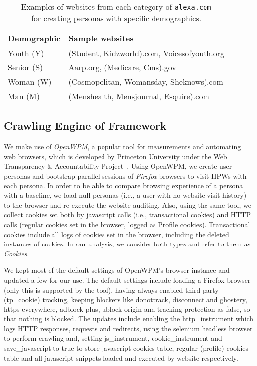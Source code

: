 \documentclass{article}
\newcommand{\hpws}{HPWs\xspace}
\newcommand{\alexa}{\texttt{alexa.com}}
\begin{document}
\begin{table}
    \centering
    \caption{Examples of websites from each category of \alexa\\for creating personas with specific demographics.}
    {\small 
        \begin{tabular}{p{1.8cm}p{5.7cm}} 
            \toprule
            Demographic	&	Sample websites	\\
            \midrule
            Youth (Y)		&	(Student, Kidzworld).com, Voicesofyouth.org \\
            Senior (S)		&	Aarp.org, (Medicare, Cms).gov \\
            \midrule
            Woman (W)	&	(Cosmopolitan, Womansday, Sheknows).com \\
            Man (M)		&	(Menshealth, Mensjournal, Esquire).com \\
            \bottomrule
        \end{tabular}
    }
    \label{table:Alexa}
\end{table}



\subsection{Crawling Engine of Framework}\label{sec:crawling}

We make use of \emph{OpenWPM}\cite{openwpm-code}, a popular tool for measurements and automating web browsers, which is developed by Princeton University under the Web Transparency \& Accountability Project~\cite{englehardt2016online}.
Using OpenWPM, we create user personas and bootstrap parallel sessions of \emph{Firefox} browsers to visit \hpws with each persona.
In order to be able to compare browsing experience of a persona with a baseline, we load null personas (i.e., a user with no website visit history) to the browser and re-execute the website auditing.
Also, using the same tool, we collect cookies set both by javascript calls (i.e., transactional cookies) and HTTP calls (regular cookies set in the browser, logged as Profile cookies).
Transactional cookies include all logs of cookies set in the browser, including the deleted instances of cookies.
In our analysis, we consider both types and refer to them as \emph{Cookies}.


We kept most of the default settings of OpenWPM's browser instance and updated a few for our use.
The default settings include loading a Firefox browser (only this is supported by the tool), having always enabled third party (tp\_cookie) tracking, keeping blockers like donottrack, disconnect and ghostery, https-everywhere, adblock-plus, ublock-origin and tracking protection as false, so that nothing is blocked.
The updates include enabling the http\_instrument which logs HTTP responses, requests and redirects, using the selenium headless browser to perform crawling and, setting js\_instrument, cookie\_instrument and save\_javascript to true to store javascript cookies table, regular (profile) cookies table and all javascript snippets loaded and executed by website respectively.
\end{document}
